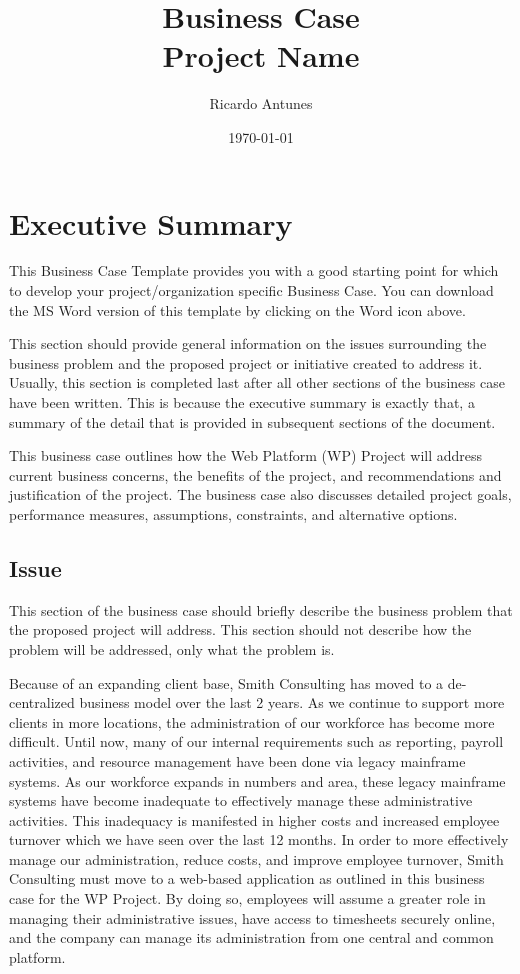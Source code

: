 \documentclass[11pt]{article}
\author{Ricardo Antunes}
\date{\today}
\title{Business Case\\\medskip
\large Project Name}
\begin{document}
\maketitle
\tableofcontents



\section{Executive Summary}
\label{sec:orga951c07}
This Business Case Template provides you with a good starting point for which to develop your project/organization specific Business Case. You can download the MS Word version of this template by clicking on the Word icon above.

This section should provide general information on the issues surrounding the business problem and the proposed project or initiative created to address it. Usually, this section is completed last after all other sections of the business case have been written. This is because the executive summary is exactly that, a summary of the detail that is provided in subsequent sections of the document.

This business case outlines how the Web Platform (WP) Project will address current business concerns, the benefits of the project, and recommendations and justification of the project. The business case also discusses detailed project goals, performance measures, assumptions, constraints, and alternative options.

\subsection{Issue}
\label{sec:org099ad75}
This section of the business case should briefly describe the business problem that the proposed project will address. This section should not describe how the problem will be addressed, only what the problem is.

Because of an expanding client base, Smith Consulting has moved to a de-centralized business model over the last 2 years. As we continue to support more clients in more locations, the administration of our workforce has become more difficult. Until now, many of our internal requirements such as reporting, payroll activities, and resource management have been done via legacy mainframe systems. As our workforce expands in numbers and area, these legacy mainframe systems have become inadequate to effectively manage these administrative activities. This inadequacy is manifested in higher costs and increased employee turnover which we have seen over the last 12 months. In order to more effectively manage our administration, reduce costs, and improve employee turnover, Smith Consulting must move to a web-based application as outlined in this business case for the WP Project. By doing so, employees will assume a greater role in managing their administrative issues, have access to timesheets securely online, and the company can manage its administration from one central and common platform.
\end{document}

